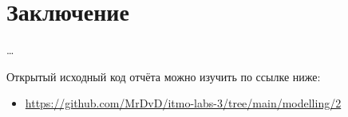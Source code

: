 \section{Заключение}

\dots

Открытый исходный код отчёта можно изучить по ссылке ниже:
\begin{itemize}
    \item \url{https://github.com/MrDvD/itmo-labs-3/tree/main/modelling/2}
\end{itemize}